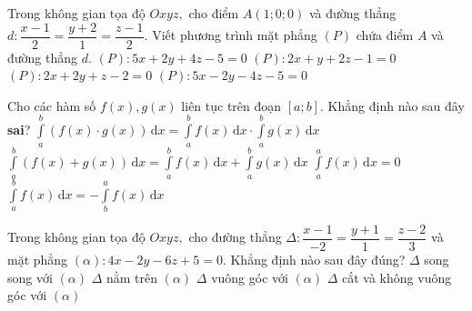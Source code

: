 \begin{ex}%
Trong không gian tọa độ $Oxyz,$ cho điểm $A(1; 0; 0)$ và đường thẳng $d\colon \dfrac{x-1}{2}=\dfrac{y+2}1=\dfrac{z-1}{2}.$ Viết phương trình mặt phẳng $(P)$ chứa điểm $A$ và đường thẳng $d$.
\choice
{$(P)\colon 5x+2y+4z-5=0$}
{$(P)\colon 2x+y+2z-1=0$}
{$(P)\colon 2x+2y+z-2=0$}
{\True $(P)\colon 5x-2y-4z-5=0$}
\end{ex}

\begin{ex}%
Cho các hàm số $f(x), g(x)$ liên tục trên đoạn $[a; b]$. Khẳng định nào sau đây {\bf sai}?
\choice
{\True $\displaystyle \int \limits_a^b \left(f(x)\cdot g(x)\right)\mathrm{\,d}x=\int \limits_a^b f(x)\mathrm{\,d}x\cdot \int \limits_a^b g(x)\mathrm{\,d}x$}
{$\displaystyle \int \limits_a^b \left(f(x)+ g(x)\right)\mathrm{\,d}x=\int \limits_a^b f(x)\mathrm{\,d}x+ \int \limits_a^b g(x)\mathrm{\,d}x$}
{$\displaystyle \int \limits_a^a f(x)\mathrm{\,d}x=0$}
{$\displaystyle \int \limits_a^b f(x)\mathrm{\,d}x=- \int \limits_b^a f(x)\mathrm{\,d}x$}
\end{ex}

\begin{ex}%
Trong không gian tọa độ $Oxyz,$ cho đường thẳng $\Delta\colon \dfrac{x-1}{-2}=\dfrac{y+1}1=\dfrac{z-2}{3}$ và mặt phẳng $(\alpha)\colon 4x-2y-6z+5=0.$ Khẳng định nào sau đây đúng?
\choice
{$\Delta$ song song với $(\alpha)$}
{$\Delta$ nằm trên $(\alpha)$}
{\True $\Delta$ vuông góc với $(\alpha)$}
{$\Delta$ cắt và không vuông góc với $(\alpha)$}
\end{ex}

